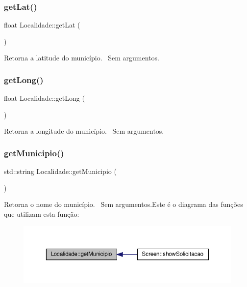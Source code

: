 \subsubsection{\texorpdfstring{get\+Lat()}{getLat()}}
{\footnotesize\ttfamily float Localidade\+::get\+Lat (\begin{DoxyParamCaption}{ }\end{DoxyParamCaption})}

Retorna a latitude do município.~\newline
Sem argumentos.\mbox{\label{classLocalidade_a97a3f7eabe1cf45e3f0bed721d4641d4}} 
\subsubsection{\texorpdfstring{get\+Long()}{getLong()}}
{\footnotesize\ttfamily float Localidade\+::get\+Long (\begin{DoxyParamCaption}{ }\end{DoxyParamCaption})}

Retorna a longitude do município.~\newline
Sem argumentos.\mbox{\label{classLocalidade_afd2127dad81d3131016f1dd4bcb9823b}} 
\subsubsection{\texorpdfstring{get\+Municipio()}{getMunicipio()}}
{\footnotesize\ttfamily std\+::string Localidade\+::get\+Municipio (\begin{DoxyParamCaption}{ }\end{DoxyParamCaption})}

Retorna o nome do município.~\newline
Sem argumentos.Este é o diagrama das funções que utilizam esta função\+:\nopagebreak
\begin{figure}[H]
\begin{center}
\leavevmode
\includegraphics[width=350pt]{classLocalidade_afd2127dad81d3131016f1dd4bcb9823b_icgraph}
\end{center}
\end{figure}
\mbox{\label{classLocalidade_a03249330040cf75b6a964cced77526cf}} 
